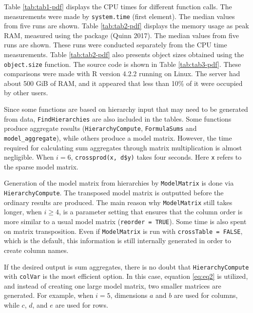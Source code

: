 Table \ref{tab:tab1-pdf}
displays the CPU times for different function calls.
The measurements were made by \texttt{system.time} (first element). The median values from five runs are shown.
Table \ref{tab:tab2-pdf}
displays the memory usage as peak RAM, measured using the  package (Quinn 2017).
The median values from five runs are shown.
These runs were conducted separately from the CPU time measurements.
Table \ref{tab:tab2-pdf}
also presents object sizes obtained using the \texttt{object.size} function.
The source code is shown in
Table \ref{tab:tab3-pdf}.
These comparisons were made with R version 4.2.2 running on Linux.
The server had about 500 GiB of RAM, and it appeared that less than 10\% of it were occupied by other users.

Since some functions are based on hierarchy input that may need to be generated from data, \texttt{FindHierarchies} are also included in the tables.
Some functions produce aggregate results \linebreak (\texttt{HierarchyCompute}, \texttt{FormulaSums} and \texttt{model\_aggregate}), while others produce a model matrix.
\linebreak However, the time required for calculating sum aggregates through matrix multiplication is almost negligible.
When \(i=6\), \texttt{crossprod(x,\ d\$y)} takes four seconds. Here \texttt{x} refers to the sparse model matrix.

Generation of the model matrix from hierarchies by \texttt{ModelMatrix} is done via \texttt{HierarchyCompute}.
The transposed model matrix is outputted before the ordinary results are produced.
The main reason why \texttt{ModelMatrix} still takes longer, when \(i \geq 4\), is a parameter setting that ensures that the column order is more similar to a usual model matrix (\texttt{reorder\ =\ TRUE}).
Some time is also spent on matrix transposition.
Even if \texttt{ModelMatrix} is run with \texttt{crossTable\ =\ FALSE}, which is the default, this information is still internally generated in order to create column names.

If the desired output is sum aggregates, there is no doubt that \texttt{HierarchyCompute} with \texttt{colVar} is the most efficient option.
In this case, equation \eqref{eq:eq2} is utilized, and instead of creating one large model matrix, two smaller matrices are generated.
For example, when \(i=5\), dimensions \(a\) and \(b\) are used for columns, while \(c\), \(d\), and \(e\) are used for rows.

